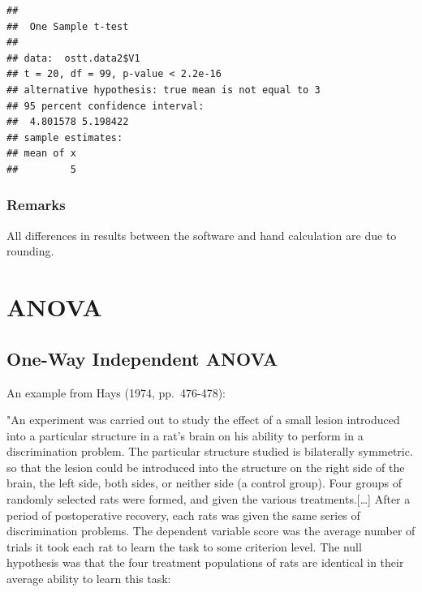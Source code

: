 \documentclass[
]{book}
\newenvironment{Shaded}{\begin{snugshade}}{\end{snugshade}}
\newcommand{\DataTypeTok}[1]{\textcolor[rgb]{0.13,0.29,0.53}{#1}}
\newcommand{\DecValTok}[1]{\textcolor[rgb]{0.00,0.00,0.81}{#1}}
\newcommand{\KeywordTok}[1]{\textcolor[rgb]{0.13,0.29,0.53}{\textbf{#1}}}
\newcommand{\NormalTok}[1]{#1}
\newcommand{\OperatorTok}[1]{\textcolor[rgb]{0.81,0.36,0.00}{\textbf{#1}}}
\begin{document}
\begin{Shaded}
\end{Shaded}

\begin{verbatim}
## 
## 	One Sample t-test
## 
## data:  ostt.data2$V1
## t = 20, df = 99, p-value < 2.2e-16
## alternative hypothesis: true mean is not equal to 3
## 95 percent confidence interval:
##  4.801578 5.198422
## sample estimates:
## mean of x 
##         5
\end{verbatim}

\hypertarget{remarks-4}{%
\subsection{Remarks}\label{remarks-4}}

All differences in results between the software and hand calculation are due to rounding.

\hypertarget{anova}{%
\chapter{ANOVA}\label{anova}}

\hypertarget{one-way-independent-anova}{%
\section{One-Way Independent ANOVA}\label{one-way-independent-anova}}

An example from Hays (1974, pp.~476-478):

"An experiment was carried out to study the effect of a small lesion introduced into a particular structure in a rat's brain on his ability to perform in a discrimination problem. The particular structure studied is bilaterally symmetric. so that the lesion could be introduced into the structure on the right side of the brain, the left side, both sides, or neither side (a control group). Four groups of randomly selected rats were formed, and given the various treatments.{[}\ldots{]} After a period of postoperative recovery, each rats was given the same series of discrimination problems. The dependent variable score was the average number of trials it took each rat to learn the task to some criterion level. The null hypothesis was that the four treatment populations of rats are identical in their average ability to learn this task:
\end{document}
